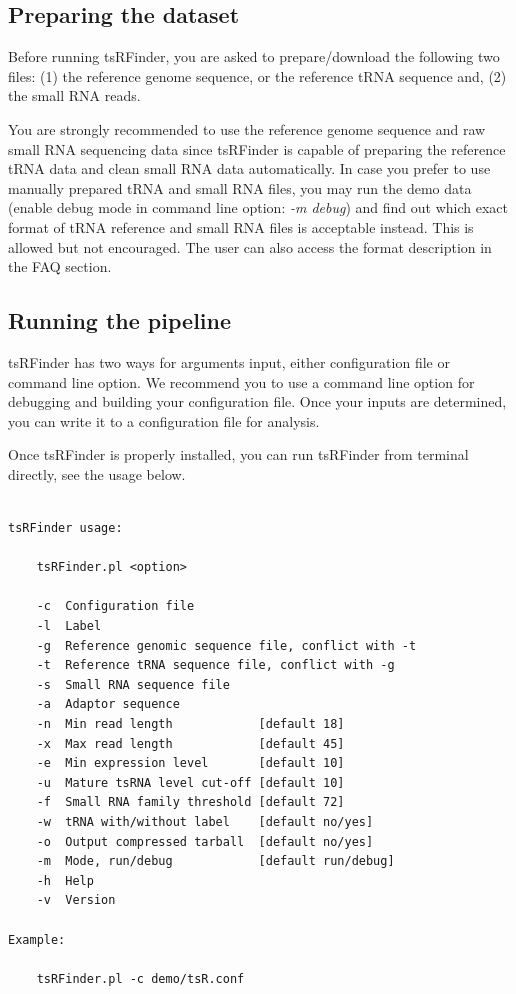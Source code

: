 \documentclass[11pt, a4paper]{article}
\begin{document}
\subsection{Preparing the dataset}

Before running tsRFinder, you are asked to prepare/download the following two files: (1) the reference genome sequence, or the reference tRNA sequence and, (2) the small RNA reads.

You are strongly recommended to use the reference genome sequence and raw small RNA sequencing data since tsRFinder is capable of preparing the reference tRNA data and clean small RNA data automatically. In case you prefer to use manually prepared tRNA and small RNA files, you may run the demo data (enable debug mode in command line option: \emph{-m debug}) and find out which exact format of tRNA reference and small RNA files is acceptable instead. This is allowed but not encouraged. The user can also access the format description in the FAQ section.

\subsection{Running the pipeline}

tsRFinder has two ways for arguments input, either configuration file or command line option. We recommend you to use a command line option for debugging and building your configuration file. Once your inputs are determined, you can write it to a configuration file for analysis.

Once tsRFinder is properly installed, you can run tsRFinder from terminal directly, see the usage below.

{\scriptsize \begin{tcolorbox}[colback=blue!5!white,colframe=blue!75!black,title=Usage of tsRFinder: ./tsRFinder.pl -h]
\begin{verbatim}

tsRFinder usage:

    tsRFinder.pl <option>

    -c  Configuration file
    -l  Label
    -g  Reference genomic sequence file, conflict with -t
    -t  Reference tRNA sequence file, conflict with -g
    -s  Small RNA sequence file
    -a  Adaptor sequence
    -n  Min read length            [default 18]
    -x  Max read length            [default 45]
    -e  Min expression level       [default 10]
    -u  Mature tsRNA level cut-off [default 10]
    -f  Small RNA family threshold [default 72]
    -w  tRNA with/without label    [default no/yes]
    -o  Output compressed tarball  [default no/yes]
    -m  Mode, run/debug            [default run/debug]
    -h  Help
    -v  Version

Example:

    tsRFinder.pl -c demo/tsR.conf

\end{verbatim}
\end{tcolorbox}}
\end{document}
